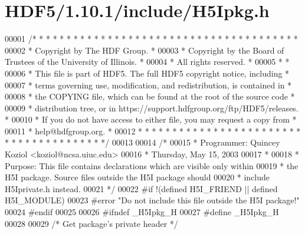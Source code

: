 \hypertarget{_h_d_f5_21_810_81_2include_2_h5_ipkg_8h_source}{}\section{H\+D\+F5/1.10.1/include/\+H5\+Ipkg.h}
\label{_h_d_f5_21_810_81_2include_2_h5_ipkg_8h_source}

\begin{DoxyCode}
00001 \textcolor{comment}{/* * * * * * * * * * * * * * * * * * * * * * * * * * * * * * * * * * * * * * *}
00002 \textcolor{comment}{ * Copyright by The HDF Group.                                               *}
00003 \textcolor{comment}{ * Copyright by the Board of Trustees of the University of Illinois.         *}
00004 \textcolor{comment}{ * All rights reserved.                                                      *}
00005 \textcolor{comment}{ *                                                                           *}
00006 \textcolor{comment}{ * This file is part of HDF5.  The full HDF5 copyright notice, including     *}
00007 \textcolor{comment}{ * terms governing use, modification, and redistribution, is contained in    *}
00008 \textcolor{comment}{ * the COPYING file, which can be found at the root of the source code       *}
00009 \textcolor{comment}{ * distribution tree, or in https://support.hdfgroup.org/ftp/HDF5/releases.  *}
00010 \textcolor{comment}{ * If you do not have access to either file, you may request a copy from     *}
00011 \textcolor{comment}{ * help@hdfgroup.org.                                                        *}
00012 \textcolor{comment}{ * * * * * * * * * * * * * * * * * * * * * * * * * * * * * * * * * * * * * * */}
00013 
00014 \textcolor{comment}{/*}
00015 \textcolor{comment}{ * Programmer:  Quincey Koziol <koziol@ncsa.uiuc.edu>}
00016 \textcolor{comment}{ *      Thursday, May 15, 2003}
00017 \textcolor{comment}{ *}
00018 \textcolor{comment}{ * Purpose: This file contains declarations which are visible only within}
00019 \textcolor{comment}{ *      the H5I package.  Source files outside the H5I package should}
00020 \textcolor{comment}{ *      include H5Iprivate.h instead.}
00021 \textcolor{comment}{ */}
00022 \textcolor{preprocessor}{#if !(defined H5I\_FRIEND || defined H5I\_MODULE)}
00023 \textcolor{preprocessor}{#error "Do not include this file outside the H5I package!"}
00024 \textcolor{preprocessor}{#endif}
00025 
00026 \textcolor{preprocessor}{#ifndef \_H5Ipkg\_H}
00027 \textcolor{preprocessor}{#define \_H5Ipkg\_H}
00028 
00029 \textcolor{comment}{/* Get package's private header */}

\end{DoxyCode}
